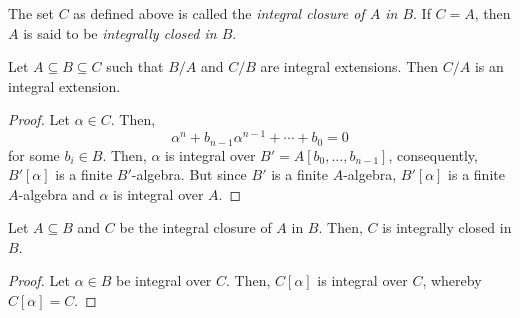 The set $C$ as defined above is called the \textit{integral closure of $A$ in $B$}. If $C = A$, then $A$ is said to be \textit{integrally closed in $B$}.

\begin{theorem}
    Let $A\subseteq B\subseteq C$ such that $B/A$ and $C/B$ are integral extensions. Then $C/A$ is an integral extension.
\end{theorem}
\begin{proof}
    Let $\alpha\in C$. Then, 
    \begin{equation*}
        \alpha^n + b_{n - 1}\alpha^{n - 1} + \cdots + b_0 = 0
    \end{equation*}
    for some $b_i\in B$. Then, $\alpha$ is integral over $B' = A[b_0,\ldots,b_{n - 1}]$, consequently, $B'[\alpha]$ is a finite $B'$-algebra. But since $B'$ is a finite $A$-algebra, $B'[\alpha]$ is a finite $A$-algebra and $\alpha$ is integral over $A$.
\end{proof}

\begin{corollary}
    Let $A\subseteq B$ and $C$ be the integral closure of $A$ in $B$. Then, $C$ is integrally closed in $B$.
\end{corollary}
\begin{proof}
    Let $\alpha\in B$ be integral over $C$. Then, $C[\alpha]$ is integral over $C$, whereby $C[\alpha] = C$.
\end{proof}

